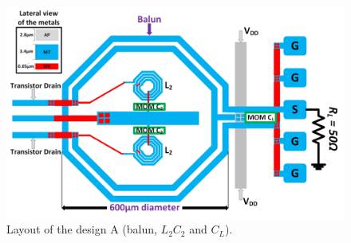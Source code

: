 \documentclass[conference]{IEEEtran}
\begin{document}
\begin{figure}[!t]
\centering
\captionsetup{font=footnotesize}
\includegraphics[width=1\linewidth]{Images/Output_Network_Comp/Balun_V2.jpg}
\caption{Layout of the design A (balun, $L_2C_2$ and $C_L$).}
\label{fig:ON_X1}
\vspace{-0.1in}
\end{figure}
\end{document}
